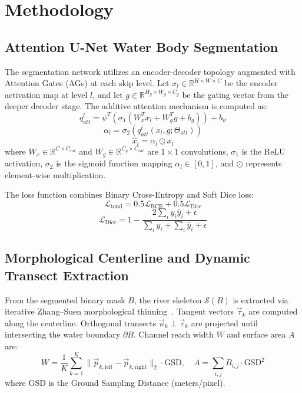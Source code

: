 \documentclass[conference]{IEEEtran}
\begin{document}
\section{Methodology}
\subsection{Attention U-Net Water Body Segmentation}
The segmentation network utilizes an encoder-decoder topology augmented with Attention Gates (AGs) at each skip level. Let $x_l \in \mathbb{R}^{H \times W \times C}$ be the encoder activation map at level $l$, and let $g \in \mathbb{R}^{H_g \times W_g \times C_g}$ be the gating vector from the deeper decoder stage. The additive attention mechanism is computed as:
\begin{equation}
q_{att}^l = \psi^T \left( \sigma_1 \left( W_x^T x_l + W_g^T g + b_g \right) \right) + b_\psi
\end{equation}
\begin{equation}
\alpha_l = \sigma_2 \left( q_{att}^l \left( x_l, g; \Theta_{att} \right) \right)
\end{equation}
\begin{equation}
\hat{x}_l = \alpha_l \odot x_l
\end{equation}
where $W_x \in \mathbb{R}^{C \times C_{int}}$ and $W_g \in \mathbb{R}^{C_g \times C_{int}}$ are $1 \times 1$ convolutions, $\sigma_1$ is the ReLU activation, $\sigma_2$ is the sigmoid function mapping $\alpha_l \in [0, 1]$, and $\odot$ represents element-wise multiplication.

The loss function combines Binary Cross-Entropy and Soft Dice loss:
\begin{equation}
\mathcal{L}_{\text{total}} = 0.5 \mathcal{L}_{\text{BCE}} + 0.5 \mathcal{L}_{\text{Dice}}
\end{equation}
\begin{equation}
\mathcal{L}_{\text{Dice}} = 1 - \frac{2 \sum_i y_i \hat{y}_i + \epsilon}{\sum_i y_i + \sum_i \hat{y}_i + \epsilon}
\end{equation}

\subsection{Morphological Centerline and Dynamic Transect Extraction}
From the segmented binary mask $B$, the river skeleton $\mathcal{S}(B)$ is extracted via iterative Zhang--Suen morphological thinning~\cite{zhang1984}. Tangent vectors $\vec{\tau}_k$ are computed along the centerline. Orthogonal transects $\vec{n}_k \perp \vec{\tau}_k$ are projected until intersecting the water boundary $\partial B$. Channel reach width $W$ and surface area $A$ are:
\begin{equation}
W = \frac{1}{K} \sum_{k=1}^K \|\vec{p}_{k,\text{left}} - \vec{p}_{k,\text{right}}\|_2 \cdot \text{GSD}, \quad A = \sum_{i,j} B_{i,j} \cdot \text{GSD}^2
\end{equation}
where $\text{GSD}$ is the Ground Sampling Distance (meters/pixel).
\end{document}

